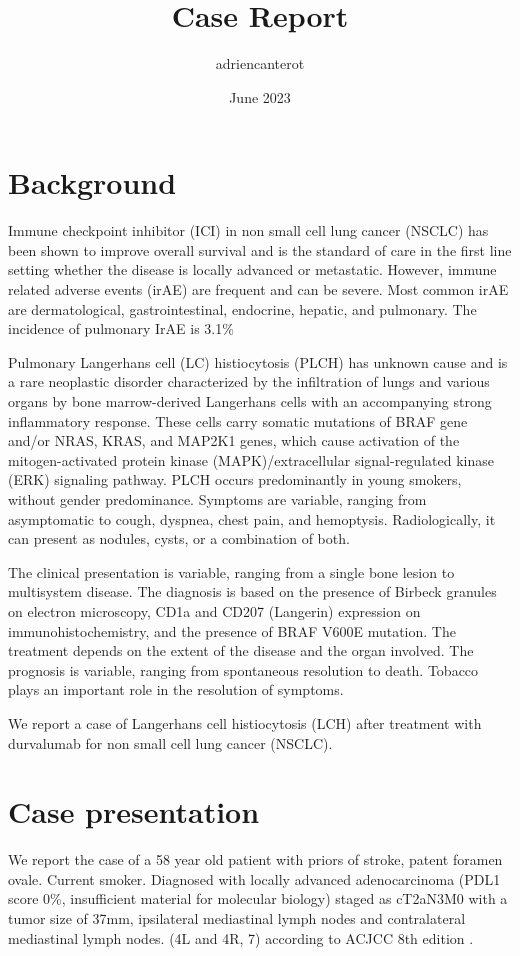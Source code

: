 \documentclass{article}
\title{Case Report}
\author{adriencanterot}
\date{June 2023}
\begin{document}
\maketitle

\section{Background}
Immune checkpoint inhibitor (ICI) in non small cell lung cancer (NSCLC) has been shown to improve overall survival and is the standard of care in the first line setting whether the disease is locally advanced or metastatic.
However, immune related adverse events (irAE)  are frequent and can be severe. Most common irAE are dermatological, gastrointestinal, endocrine, hepatic, and pulmonary. The incidence of pulmonary IrAE is 3.1\% \cite{ramos-casals_immune-related_2020}

Pulmonary Langerhans cell (LC) histiocytosis (PLCH) has unknown cause and is a rare neoplastic disorder characterized by the infiltration of lungs and various organs by bone marrow-derived Langerhans cells with an accompanying strong inflammatory response. These cells carry somatic mutations of BRAF gene and/or NRAS, KRAS, and MAP2K1 genes, which cause activation of the mitogen-activated protein kinase (MAPK)/extracellular signal-regulated kinase (ERK) signaling pathway. PLCH occurs predominantly in young smokers, without gender predominance. \cite{radzikowska_update_2021}
Symptoms are variable, ranging from asymptomatic to cough, dyspnea, chest pain, and hemoptysis.
Radiologically, it can present as nodules, cysts, or a combination of both. 

The clinical presentation is variable, ranging from a single bone lesion to multisystem disease. The diagnosis is based on the presence of Birbeck granules on electron microscopy, CD1a and CD207 (Langerin) expression on immunohistochemistry, and the presence of BRAF V600E mutation. The treatment depends on the extent of the disease and the organ involved. The prognosis is variable, ranging from spontaneous resolution to death. Tobacco plays an important role in the resolution of symptoms.

We report a case of Langerhans cell histiocytosis (LCH) after treatment with durvalumab for non small cell lung cancer (NSCLC).

\section{Case presentation}
We report the case of a 58 year old patient with priors of stroke, patent foramen ovale. Current smoker.
Diagnosed with locally advanced adenocarcinoma (PDL1 score 0\%, insufficient material for molecular biology) staged as cT2aN3M0 with a tumor size of 37mm, ipsilateral mediastinal lymph nodes and contralateral mediastinal lymph nodes. (4L and 4R, 7) according to ACJCC 8th edition \cite{goldstraw_iaslc_2016}.
\end{document}
